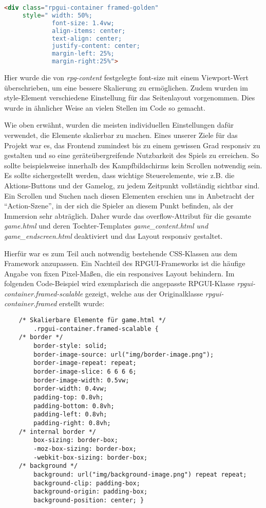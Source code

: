 \begin{lstlisting}[language=html]
<div class="rpgui-container framed-golden" 
     style=" width: 50%;
             font-size: 1.4vw; 
             align-items: center;
             text-align: center;
             justify-content: center;
             margin-left: 25%; 
             margin-right:25%">
\end{lstlisting}

Hier wurde die von \textit{rpg-content} festgelegte font-size mit einem Viewport-Wert überschrieben, um eine bessere Skalierung zu ermöglichen. Zudem wurden im style-Element verschiedene Einstellung für das Seitenlayout vorgenommen. Dies wurde in ähnlicher Weise an vielen Stellen im Code so gemacht.

Wie oben erwähnt, wurden die meisten individuellen Einstellungen dafür verwendet, die Elemente skalierbar zu machen. Eines unserer Ziele für das Projekt war es, das Frontend zumindest bis zu einem gewissen Grad responsiv zu gestalten und so eine geräteübergreifende Nutzbarkeit des Spiels zu erreichen. So sollte beispielsweise innerhalb des Kampfbildschirms kein Scrollen notwendig sein. Es sollte sichergestellt werden, dass wichtige Steuerelemente, wie z.B. die Aktions-Buttons und der Gamelog, zu jedem Zeitpunkt vollständig sichtbar sind. Ein Scrollen und Suchen nach diesen Elementen erschien uns in Anbetracht der \enquote{Action-Szene}, in der sich die Spieler an diesem Punkt befinden, als der Immersion sehr abträglich. Daher wurde das overflow-Attribut für die gesamte \textit{game.html} und deren Tochter-Templates \textit{game\_content.html und game\_endscreen.html} deaktiviert und das Layout responsiv gestaltet. 

Hierfür war es zum Teil auch notwendig bestehende CSS-Klassen aus dem Framework anzupassen. Ein Nachteil des RPGUI-Frameworks ist die häufige Angabe von fixen Pixel-Maßen, die ein responsives Layout behindern. Im folgenden Code-Beispiel wird exemplarisch die angepasste RPGUI-Klasse \textit{rpgui-container.framed-scalable} gezeigt, welche aus der Originalklasse \textit{rpgui-container.framed} erstellt wurde:

\pagebreak
\begin{lstlisting}
    /* Skalierbare Elemente für game.html */
        .rpgui-container.framed-scalable {
    /* border */
        border-style: solid;
        border-image-source: url("img/border-image.png");
        border-image-repeat: repeat;
        border-image-slice: 6 6 6 6;
        border-image-width: 0.5vw;
        border-width: 0.4vw;
        padding-top: 0.8vh;
        padding-bottom: 0.8vh;
        padding-left: 0.8vh;
        padding-right: 0.8vh;
    /* internal border */
        box-sizing: border-box;
        -moz-box-sizing: border-box;
        -webkit-box-sizing: border-box;
    /* background */
        background: url("img/background-image.png") repeat repeat;
        background-clip: padding-box;
        background-origin: padding-box;
        background-position: center; }
\end{lstlisting}


